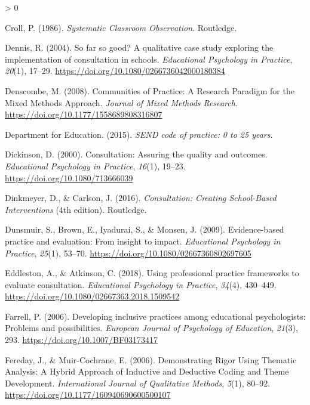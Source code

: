 \documentclass[
  english,
  man]{apa7}
\newlength{\cslhangindent}
\newenvironment{CSLReferences}[2] %
 {%
  \setlength{\parindent}{0pt}
  \ifodd #1 \everypar{\setlength{\hangindent}{\cslhangindent}}\ignorespaces\fi
  \ifnum #2 > 0
  \setlength{\parskip}{#2\baselineskip}
  \fi
 }%
 {}
\begin{document}
\begin{CSLReferences}{1}{0}
\leavevmode\hypertarget{ref-crollSystematicClassroomObservation1986}{}%
Croll, P. (1986). \emph{Systematic {Classroom Observation}}. {Routledge}.

\leavevmode\hypertarget{ref-dennisFarGoodQualitative2004}{}%
Dennis, R. (2004). So far so good? {A} qualitative case study exploring the implementation of consultation in schools. \emph{Educational Psychology in Practice}, \emph{20}(1), 17--29. \url{https://doi.org/10.1080/0266736042000180384}

\leavevmode\hypertarget{ref-denscombeCommunitiesPracticeResearch2008}{}%
Denscombe, M. (2008). Communities of {Practice}: {A Research Paradigm} for the {Mixed Methods Approach}. \emph{Journal of Mixed Methods Research}. \url{https://doi.org/10.1177/1558689808316807}

\leavevmode\hypertarget{ref-departmentforeducationSENDCodePractice2015}{}%
Department for Education. (2015). \emph{{SEND} code of practice: 0 to 25 years}.

\leavevmode\hypertarget{ref-dickinsonConsultationAssuringQuality2000a}{}%
Dickinson, D. (2000). Consultation: {Assuring} the quality and outcomes. \emph{Educational Psychology in Practice}, \emph{16}(1), 19--23. \url{https://doi.org/10.1080/713666039}

\leavevmode\hypertarget{ref-dinkmeyerConsultationCreatingSchoolBased2016}{}%
Dinkmeyer, D., \& Carlson, J. (2016). \emph{Consultation: {Creating School}-{Based Interventions}} (4th edition). {Routledge}.

\leavevmode\hypertarget{ref-dunsmuirEvidenceBasedPractice2009}{}%
Dunsmuir, S., Brown, E., Iyadurai, S., \& Monsen, J. (2009). Evidence-based practice and evaluation: From insight to impact. \emph{Educational Psychology in Practice}, \emph{25}(1), 53--70. \url{https://doi.org/10.1080/02667360802697605}

\leavevmode\hypertarget{ref-eddlestonUsingProfessionalPractice2018}{}%
Eddleston, A., \& Atkinson, C. (2018). Using professional practice frameworks to evaluate consultation. \emph{Educational Psychology in Practice}, \emph{34}(4), 430--449. \url{https://doi.org/10.1080/02667363.2018.1509542}

\leavevmode\hypertarget{ref-farrellDevelopingInclusivePractices2006}{}%
Farrell, P. (2006). Developing inclusive practices among educational psychologists: {Problems} and possibilities. \emph{European Journal of Psychology of Education}, \emph{21}(3), 293. \url{https://doi.org/10.1007/BF03173417}

\leavevmode\hypertarget{ref-feredayDemonstratingRigorUsing2006}{}%
Fereday, J., \& Muir-Cochrane, E. (2006). Demonstrating {Rigor Using Thematic Analysis}: {A Hybrid Approach} of {Inductive} and {Deductive Coding} and {Theme Development}. \emph{International Journal of Qualitative Methods}, \emph{5}(1), 80--92. \url{https://doi.org/10.1177/160940690600500107}


\end{CSLReferences}
\end{document}
